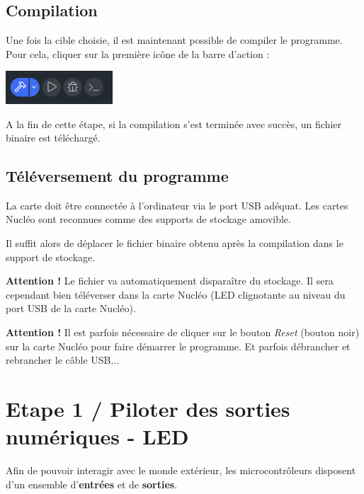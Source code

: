 \documentclass[a4paper,11pt,titlepage]{article} %
\begin{document}
\subsection{Compilation}

Une fois la cible choisie, il est maintenant possible de compiler le programme. Pour cela, cliquer sur la première icône de la barre d'action :

\begin{center}
	\includegraphics[width=0.3\textwidth]{images/keil_compile.png}
\end{center}

A la fin de cette étape, si la compilation s'est terminée avec succès, un fichier binaire est téléchargé.


\subsection{Téléversement du programme}

La carte doit être connectée à l'ordinateur via le port USB adéquat. Les cartes Nucléo sont reconnues comme des supports de stockage amovible.

Il suffit alors de déplacer le fichier binaire obtenu après la compilation dans le support de stockage.

\bigskip

\textbf{Attention !} Le fichier va automatiquement disparaître du stockage. Il sera cependant bien téléverser dans la carte Nucléo (LED clignotante au niveau du port USB de la carte Nucléo).

\bigskip

\textbf{Attention !} Il est parfois nécessaire de cliquer sur le bouton \textit{Reset} (bouton noir) sur la carte Nucléo pour faire démarrer le programme. Et parfois débrancher et rebrancher le câble USB...



\cleardoublepage
\section{Etape 1 / Piloter des sorties numériques - LED}

Afin de pouvoir interagir avec le monde extérieur, les microcontrôleurs disposent d'un ensemble d'\textbf{entrées} et de \textbf{sorties}. 
\end{document}
